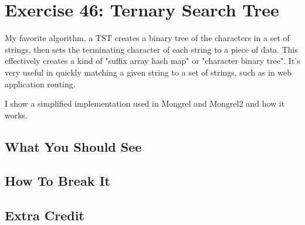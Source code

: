 \chapter{Exercise 46: Ternary Search Tree}

My favorite algorithm, a TST creates a binary tree of the characters in a set
of strings, then sets the terminating character of each string to a piece of
data.  This effectively creates a kind of "suffix array hash map" or "character
binary tree".  It's very useful in quickly matching a given string to a set of
strings, such as in web application routing.

I show a simplified implementation used in Mongrel and Mongrel2 and how it works.


\section{What You Should See}


\section{How To Break It}


\section{Extra Credit}


